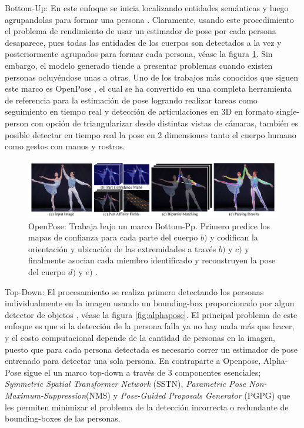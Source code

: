 Bottom-Up: En este enfoque se inicia localizando entidades semánticas y luego agrupandolas
para formar una persona \cite{DBLP:journals/corr/abs-1804-06208} \cite{8578840}
\cite{DBLP:journals/corr/InsafutdinovPAA16}.
Claramente, usando este procedimiento el problema de rendimiento de usar un
estimador de pose por cada persona desaparece, pues todas las entidades de los cuerpos son detectados
a la vez y posteriormente agrupados para formar cada persona, véase la figura \ref{fig:Openpose}.
Sin embargo, el modelo generado tiende
a presentar problemas cuando existen personas ocluyéndose unas a otras. Uno de los trabajos
más conocidos que siguen este marco es OpenPose \cite{8765346}, el cual se ha convertido en una
completa herramienta de referencia para la estimación de pose logrando realizar tareas como
seguimiento en tiempo real y detección de articulaciones en 3D en formato single-person con
opción de triangularizar desde distintas vistas de cámaras, también es posible detectar en tiempo
real la pose en 2 dimensiones tanto el cuerpo humano como gestos con manos y rostros.

\begin{figure}[ht!]
    \centering
    \includegraphics[width=0.8 \textwidth]{Chapters/1. Pose Estimation/figures/openpose.png}
    \caption{OpenPose: Trabaja bajo un marco Bottom-Pp. Primero predice los mapas de confianza para
             cada parte del cuerpo $b)$ y codifican la orientación y ubicación de las extremidades
             a través $b)$ y $c)$ y finalmente asocian cada miembro identificado y reconstruyen la
             pose del cuerpo $d)$ y $e)$ \cite{8765346}.}
    \label{fig:Openpose}
\end{figure}

Top-Down: El procesamiento se realiza primero detectando los personas individualmente en la imagen
usando un bounding-box proporcionado por algun detector de objetos
\cite{DBLP:journals/corr/NewellYD16} \cite{DBLP:journals/corr/WeiRKS16},
véase la figura \ref{fig:alphapose}.
El principal problema de este enfoque es que si la detección de la persona falla ya no hay nada más
que hacer, y el costo computacional depende de la cantidad de personas en la imagen, puesto que para
cada persona detectada es necesario correr un estimador de pose entrenado para detectar una sola
persona. En contraparte a Openpose, Alpha-Pose \cite{DBLP:journals/corr/FangXL16} sigue el un marco
top-down a través de 3 componentes esenciales; \textit{Symmetric Spatial Transformer Network} (SSTN),
\textit{Parametric Pose Non-Maximum-Suppression}(NMS) y \textit{Pose-Guided Proposals Generator}
(PGPG) que les permiten minimizar el problema de la detección incorrecta o redundante de
bounding-boxes de las personas.


